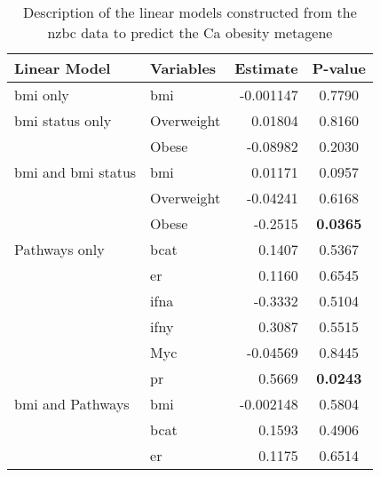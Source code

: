 	\begin{table}[htpb]
		\centering
		\caption{Description of the linear models constructed from the \gls{nzbc} data to predict the Ca obesity metagene}
		\label{tab:lm_sig_var_ca}
		\begin{threeparttable}
			\begin{tabular}{llrc}
				Linear Model & Variables & Estimate & P-value\\
				\hline
				\hline
				\rule{0pt}{2.25ex}\gls{bmi} only                           & \gls{bmi}  & -0.001147 & 0.7790 \\
				\hline
				\rule{0pt}{2.25ex}\gls{bmi} status only                    & Overweight & 0.01804   & 0.8160 \\
                                                                           & Obese      & -0.08982  & 0.2030 \\
				\hline
				\rule{0pt}{2.25ex}\gls{bmi} and \gls{bmi} status           & \gls{bmi}  & 0.01171   & 0.0957 \\
                                                                           & Overweight & -0.04241  & 0.6168 \\
                                                                           & Obese      & -0.2515   & \bfseries 0.0365  \\
				\hline
				\rule{0pt}{2.25ex}Pathways only                            & \gls{bcat} & 0.1407    & 0.5367 \\
                                                                           & \gls{er}   & 0.1160    & 0.6545 \\
                                                                           & \gls{ifna} & -0.3332   & 0.5104 \\
                                                                           & \gls{ifny} & 0.3087    & 0.5515 \\
                                                                           & Myc        & -0.04569  & 0.8445 \\
                                                                           & \gls{pr}   & 0.5669    & \bfseries 0.0243  \\
				\hline
				\rule{0pt}{2.25ex}\gls{bmi} and Pathways                   & \gls{bmi}  & -0.002148 & 0.5804 \\
                                                                           & \gls{bcat} & 0.1593    & 0.4906 \\
                                                                           & \gls{er}   & 0.1175    & 0.6514 \\

\end{tabular}
\end{threeparttable}
\end{table}
